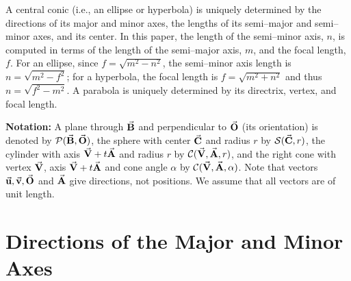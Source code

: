 
\newtheorem{example}{Example}[section]
\newtheorem{property}{Property}[section]
\newtheorem{definition}{Definition}[section]
\newtheorem{theorem}{Theorem}[section]
\newtheorem{lemma}{Lemma}[section]
\newtheorem{corollary}{Corollary}[section]

\newcommand{\DoubleSpace}{\edef\baselinestretch{1.4}\Large\normalsize}
\newcommand{\QED}{\ \ \ \rule{2mm}{3mm}\\}
\newcommand{\arrow}[1]{\vec{\bf #1}}

\setlength{\oddsidemargin}{0pt}
\setlength{\evensidemargin}{0pt}
\setlength{\headsep}{0pt}
\setlength{\topmargin}{0pt}
\setlength{\textheight}{8.75in}
\setlength{\textwidth}{6.5in}




\def\thefootnote{\arabic{footnote}}
\setcounter{footnote}{0}

     A central conic (i.e., an ellipse or hyperbola) 
is uniquely determined by the directions of
its major and minor axes, the lengths of its semi--major and semi--minor 
axes, and its center.
In this paper, the length of the semi--minor axis, $n$, is computed 
in terms of the length of the semi--major axis, $m$, and the focal length,
$f$.
For an ellipse, since $f=\sqrt{m^2-n^2}$, 
the semi--minor axis length is $n=\sqrt{m^2-f^2}$;  
for a hyperbola, the focal length is
$f=\sqrt{m^2+n^2}$ and thus $n=\sqrt{f^2-m^2}$.
A parabola is uniquely determined by its directrix, vertex, and focal
length.

{\bf Notation:}
A plane through
$\arrow{B}$ and perpendicular to $\arrow{O}$ (its orientation) is denoted by
${\cal P}(\arrow{B},\arrow{O})$, the sphere with center $\arrow{C}$ and radius
$r$ by ${\cal S}(\arrow{C},r)$, the cylinder with axis $\arrow{V}+t\arrow{A}$
and radius $r$ by ${\cal C}(\arrow{V},\arrow{A},r)$, and the right cone
with vertex $\arrow{V}$, axis $\arrow{V}+t\arrow{A}$ and cone angle $\alpha$
by ${\cal C}(\arrow{V},\arrow{A},\alpha)$.  Note that vectors $\arrow{u},
\arrow{v}, \arrow{O}$ and $\arrow{A}$ give directions, not positions.
We assume that all vectors are of unit length.


\section{Directions of the Major and Minor Axes}
\label{section:determining-axes}

